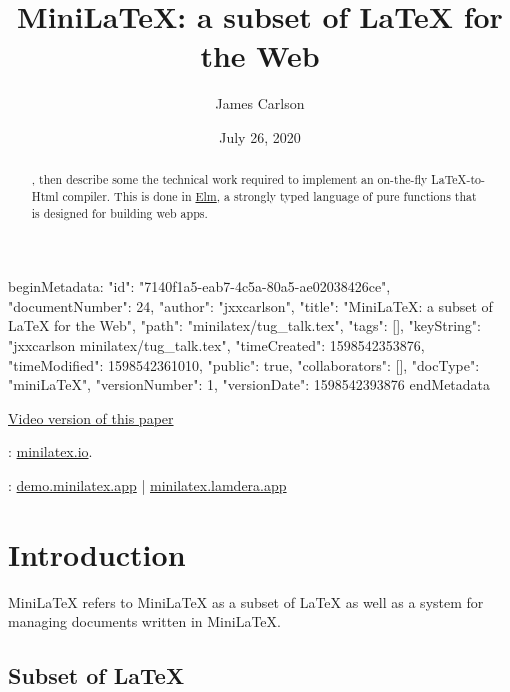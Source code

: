 beginMetadata:
{
    "id": "7140f1a5-eab7-4c5a-80a5-ae02038426ce",
    "documentNumber": 24,
    "author": "jxxcarlson",
    "title": "MiniLaTeX: a subset of LaTeX for the Web",
    "path": "minilatex/tug_talk.tex",
    "tags": [],
    "keyString": "jxxcarlson minilatex/tug_talk.tex",
    "timeCreated": 1598542353876,
    "timeModified": 1598542361010,
    "public": true,
    "collaborators": [],
    "docType": "miniLaTeX",
    "versionNumber": 1,
    "versionDate": 1598542393876
}
endMetadata
\title{MiniLaTeX: a subset of LaTeX for the Web}
\author{James Carlson}
\date{July 26, 2020}


\maketitle

\tableofcontents


\href{https://youtu.be/TAIYpCc3VV0}{Video version of this paper}

\begin{abstract}
, then describe some the technical work required to implement an on-the-fly LaTeX-to-Html compiler.  This is done in \href{https://elm-lang.org}{Elm}, a strongly typed language of pure functions that is designed for building web apps.
\end{abstract}

: \href{https://minilatex.io}{minilatex.io}.

:  \href{https://demo.minilatex.app/}{demo.minilatex.app} |
\href{https://minilatex.lamdera.app/}{minilatex.lamdera.app}


\section{Introduction}

MiniLaTeX refers to MiniLaTeX as a subset of LaTeX as well as a system for managing documents written in MiniLaTeX.


\subsection{Subset of LaTeX}

